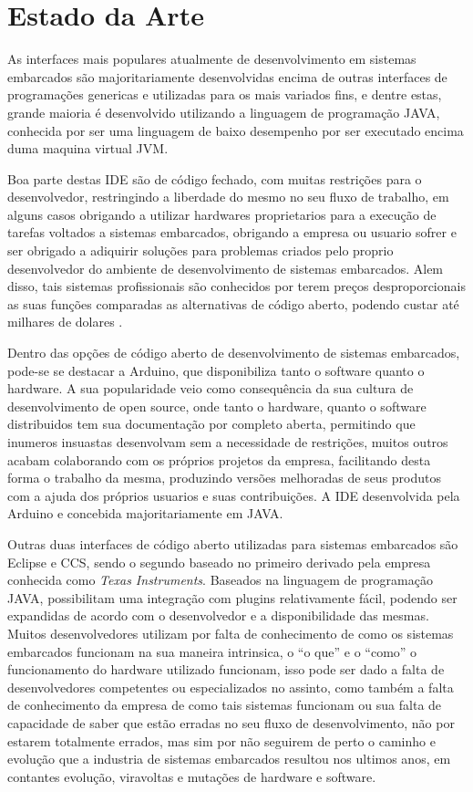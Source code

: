 \chapter{Estado da Arte}
As interfaces mais populares atualmente de desenvolvimento em sistemas embarcados são  majoritariamente desenvolvidas encima de
outras interfaces de programações genericas e utilizadas para os mais variados fins, e dentre estas, grande maioria é desenvolvido
utilizando a linguagem de programação JAVA, conhecida por ser uma linguagem de baixo desempenho por ser executado encima duma maquina
virtual JVM.

Boa parte destas IDE são de código fechado, com muitas restrições para o desenvolvedor, restringindo a liberdade do mesmo no seu fluxo
de trabalho, em alguns casos obrigando a utilizar hardwares proprietarios para a execução de tarefas voltados a sistemas embarcados,
obrigando a empresa ou usuario sofrer e ser obrigado a adiquirir soluções para problemas criados pelo proprio desenvolvedor do
ambiente de desenvolvimento de sistemas embarcados.
Alem disso, tais sistemas profissionais são conhecidos por terem preços desproporcionais as suas funções comparadas as alternativas de
código aberto, podendo custar até milhares de dolares .

Dentro das opções de código aberto de desenvolvimento de sistemas embarcados, pode-se se destacar a Arduino, que disponibiliza tanto o
software quanto o hardware. A sua popularidade veio como consequência da sua cultura de desenvolvimento de open source, onde
tanto o hardware, quanto o software distribuidos tem sua documentação por completo aberta, permitindo que inumeros insuastas desenvolvam
sem a necessidade de restrições, muitos outros acabam colaborando com os próprios projetos da empresa, facilitando desta forma
o trabalho da mesma, produzindo versões melhoradas de seus produtos com a ajuda dos próprios usuarios e suas contribuições. A IDE
desenvolvida pela Arduino e concebida majoritariamente em JAVA.

Outras duas interfaces de código aberto utilizadas para sistemas embarcados são Eclipse e CCS, sendo o segundo baseado no primeiro
derivado pela empresa conhecida como \textit{Texas Instruments}. Baseados na linguagem de programação JAVA, possibilitam uma
integração com plugins relativamente fácil, podendo ser expandidas de acordo com o desenvolvedor e a disponibilidade das mesmas.
Muitos desenvolvedores utilizam por falta de conhecimento de como os sistemas embarcados funcionam na sua maneira intrinsica,
o ``o que'' e o ``como'' o funcionamento do hardware utilizado funcionam, isso pode ser dado a falta de desenvolvedores competentes
ou especializados no assinto, como também a falta de conhecimento da empresa de como tais sistemas funcionam ou sua falta
de capacidade de saber que estão erradas no seu fluxo de desenvolvimento, não por estarem totalmente errados, mas sim por não
seguirem  de perto o caminho e evolução que a industria de sistemas embarcados resultou nos ultimos anos, em contantes evolução,
viravoltas e mutações de hardware e software.


